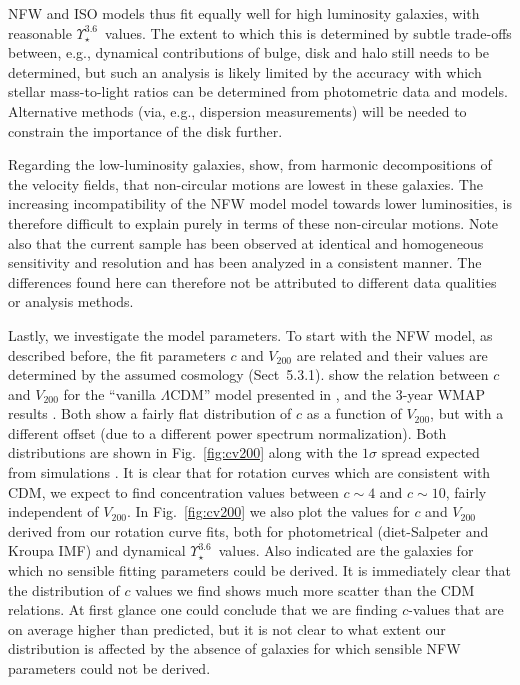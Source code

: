 \documentclass[usenatbib,usegraphicx,apjfonts,floatfix]{emulateapj}
\newcommand{\Ups}{\ensuremath{\Upsilon_{\star}^{3.6}}}
\begin{document}
NFW and ISO models thus fit equally well for high luminosity galaxies,
with reasonable \Ups\ values. The extent to which this is determined
by subtle trade-offs between, e.g., dynamical contributions of bulge,
disk and halo still needs to be determined, but such an analysis is
likely limited by the accuracy with which stellar mass-to-light ratios
can be determined from photometric data and models.  Alternative
methods (via, e.g., dispersion measurements) will be needed to
constrain the importance of the disk further.

Regarding the low-luminosity galaxies, \citet{clemens2007} show, from
harmonic decompositions of the velocity fields, that non-circular
motions are lowest in these galaxies.  The increasing incompatibility
of the NFW model model towards lower luminosities, is therefore 
difficult to explain purely in terms of these non-circular
motions. Note also that the current sample has been observed at
identical and homogeneous sensitivity and resolution and has been
analyzed in a consistent manner.  The differences found here can
therefore not be attributed to different data qualities or analysis
methods.


Lastly, we investigate the model parameters. To start with the NFW
model, as described before, the fit parameters $c$ and $V_{200}$ are
related and their values are determined by the assumed cosmology
(Sect~5.3.1).  \citet{stacy07} show the relation between $c$ and
$V_{200}$ for the ``vanilla $\Lambda$CDM'' model presented in
\citet{tegmark}, and the 3-year WMAP results \citet{spergel2006}. Both
show a fairly flat distribution of $c$ as a function of $V_{200}$, but
with a different offset (due to a different power spectrum
normalization).  Both distributions are shown in Fig.~\ref{fig:cv200}
along with the $1\sigma$ spread expected from simulations
\citep{bullock01}. It is clear that for rotation curves which are
consistent with CDM, we expect to find concentration values between $c
\sim 4$ and $c\sim 10$, fairly independent of $V_{200}$.  In
Fig.~\ref{fig:cv200} we also plot the values for $c$ and $V_{200}$
derived from our rotation curve fits, both for photometrical
(diet-Salpeter and Kroupa IMF) and dynamical \Ups\ values.  Also
indicated are the galaxies for which no sensible fitting parameters
could be derived. It is immediately clear that the distribution of $c$
values we find shows much more scatter than the CDM relations. At
first glance one could conclude that we are finding $c$-values that
are on average higher than predicted, but it is not clear to what
extent our distribution is affected by the absence of galaxies for
which sensible NFW parameters could not be derived.
\end{document}
